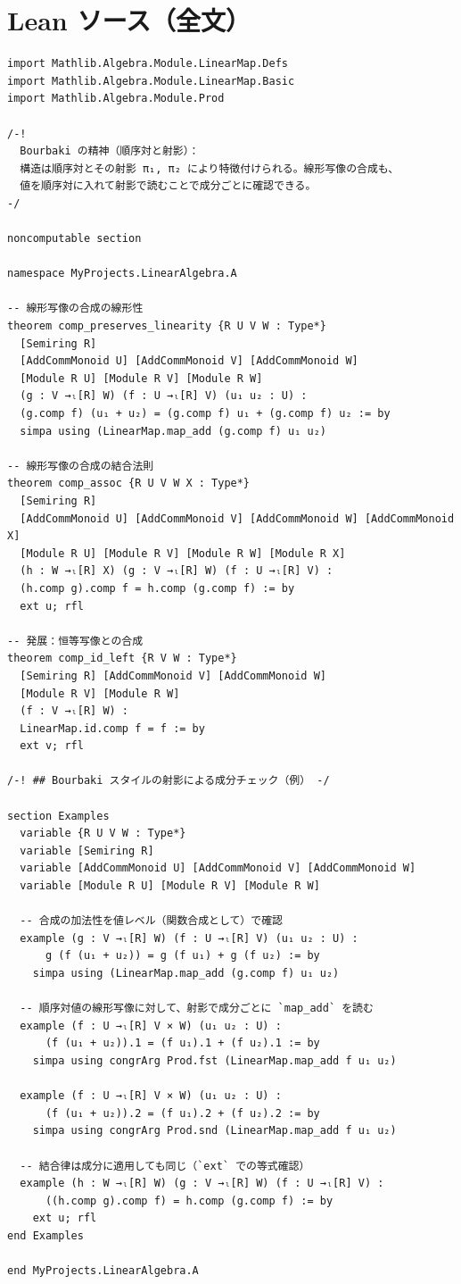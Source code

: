 \documentclass[12pt]{article}
\begin{document}
\section*{Lean ソース（全文）}
\begin{lstlisting}
import Mathlib.Algebra.Module.LinearMap.Defs
import Mathlib.Algebra.Module.LinearMap.Basic
import Mathlib.Algebra.Module.Prod

/-!
  Bourbaki の精神（順序対と射影）：
  構造は順序対とその射影 π₁, π₂ により特徴付けられる。線形写像の合成も、
  値を順序対に入れて射影で読むことで成分ごとに確認できる。
-/

noncomputable section

namespace MyProjects.LinearAlgebra.A

-- 線形写像の合成の線形性
theorem comp_preserves_linearity {R U V W : Type*}
  [Semiring R]
  [AddCommMonoid U] [AddCommMonoid V] [AddCommMonoid W]
  [Module R U] [Module R V] [Module R W]
  (g : V →ₗ[R] W) (f : U →ₗ[R] V) (u₁ u₂ : U) :
  (g.comp f) (u₁ + u₂) = (g.comp f) u₁ + (g.comp f) u₂ := by
  simpa using (LinearMap.map_add (g.comp f) u₁ u₂)

-- 線形写像の合成の結合法則
theorem comp_assoc {R U V W X : Type*}
  [Semiring R]
  [AddCommMonoid U] [AddCommMonoid V] [AddCommMonoid W] [AddCommMonoid X]
  [Module R U] [Module R V] [Module R W] [Module R X]
  (h : W →ₗ[R] X) (g : V →ₗ[R] W) (f : U →ₗ[R] V) :
  (h.comp g).comp f = h.comp (g.comp f) := by
  ext u; rfl

-- 発展：恒等写像との合成
theorem comp_id_left {R V W : Type*}
  [Semiring R] [AddCommMonoid V] [AddCommMonoid W]
  [Module R V] [Module R W]
  (f : V →ₗ[R] W) :
  LinearMap.id.comp f = f := by
  ext v; rfl

/-! ## Bourbaki スタイルの射影による成分チェック（例） -/

section Examples
  variable {R U V W : Type*}
  variable [Semiring R]
  variable [AddCommMonoid U] [AddCommMonoid V] [AddCommMonoid W]
  variable [Module R U] [Module R V] [Module R W]

  -- 合成の加法性を値レベル（関数合成として）で確認
  example (g : V →ₗ[R] W) (f : U →ₗ[R] V) (u₁ u₂ : U) :
      g (f (u₁ + u₂)) = g (f u₁) + g (f u₂) := by
    simpa using (LinearMap.map_add (g.comp f) u₁ u₂)

  -- 順序対値の線形写像に対して、射影で成分ごとに `map_add` を読む
  example (f : U →ₗ[R] V × W) (u₁ u₂ : U) :
      (f (u₁ + u₂)).1 = (f u₁).1 + (f u₂).1 := by
    simpa using congrArg Prod.fst (LinearMap.map_add f u₁ u₂)

  example (f : U →ₗ[R] V × W) (u₁ u₂ : U) :
      (f (u₁ + u₂)).2 = (f u₁).2 + (f u₂).2 := by
    simpa using congrArg Prod.snd (LinearMap.map_add f u₁ u₂)

  -- 結合律は成分に適用しても同じ（`ext` での等式確認）
  example (h : W →ₗ[R] W) (g : V →ₗ[R] W) (f : U →ₗ[R] V) :
      ((h.comp g).comp f) = h.comp (g.comp f) := by
    ext u; rfl
end Examples

end MyProjects.LinearAlgebra.A

\end{lstlisting}
\end{document}
